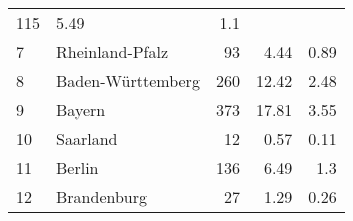 \begin{longtable}{lXrrr}
       \num{115} &
       \num[round-mode=places,round-precision=2]{5.49} &
         \num[round-mode=places,round-precision=2]{1.1} \\

     7 &
     \multicolumn{1}{X}{ Rheinland-Pfalz   } &


       \num{93} &
       \num[round-mode=places,round-precision=2]{4.44} &
         \num[round-mode=places,round-precision=2]{0.89} \\

     8 &
     \multicolumn{1}{X}{ Baden-Württemberg   } &


       \num{260} &
       \num[round-mode=places,round-precision=2]{12.42} &
         \num[round-mode=places,round-precision=2]{2.48} \\

     9 &
     \multicolumn{1}{X}{ Bayern   } &


       \num{373} &
       \num[round-mode=places,round-precision=2]{17.81} &
         \num[round-mode=places,round-precision=2]{3.55} \\

     10 &
     \multicolumn{1}{X}{ Saarland   } &


       \num{12} &
       \num[round-mode=places,round-precision=2]{0.57} &
         \num[round-mode=places,round-precision=2]{0.11} \\

     11 &
     \multicolumn{1}{X}{ Berlin   } &


       \num{136} &
       \num[round-mode=places,round-precision=2]{6.49} &
         \num[round-mode=places,round-precision=2]{1.3} \\

     12 &
     \multicolumn{1}{X}{ Brandenburg   } &


       \num{27} &
       \num[round-mode=places,round-precision=2]{1.29} &
         \num[round-mode=places,round-precision=2]{0.26} \\


\end{longtable}
